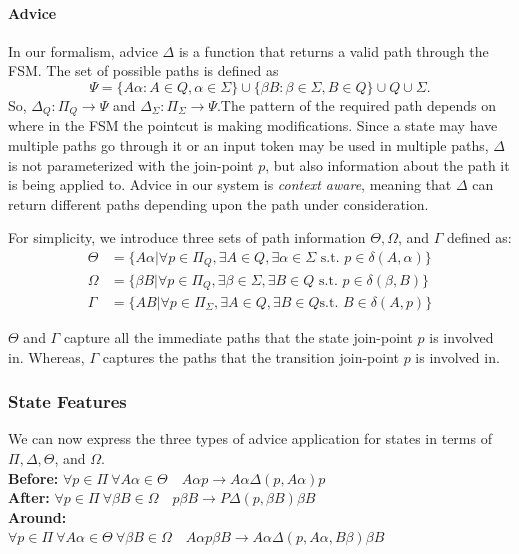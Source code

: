 \documentclass[sigplan,anonymous,review]{acmart}
\begin{document}
\paragraph{Advice} In our formalism, advice $\Delta$ is a function that returns a valid path through the FSM. The set of possible paths is defined as \[\Psi = \{A\alpha: A \in Q, \alpha \in \Sigma\} \cup \{\beta B: \beta \in \Sigma, B \in Q\} \cup Q \cup \Sigma.
\] So, $\Delta_Q: \Pi_Q \rightarrow \Psi$ and $\Delta_\Sigma: \Pi_\Sigma \rightarrow \Psi$.The pattern of the required path depends on where in the FSM the pointcut is making modifications. Since a state may have multiple paths go through it or an input token may be used in multiple paths, $\Delta$ is not parameterized with the join-point $p$, but also information about the path it is being applied to. Advice in our system is \emph{context aware}, meaning that $\Delta$ can return different paths depending upon the path under consideration. 

For simplicity, we introduce three sets of path information $\Theta, \Omega$, and $\Gamma$ defined as:
\begin{align*}
    \Theta &= \{A \alpha | \forall p \in \Pi_Q, \exists A \in Q, \exists \alpha \in \Sigma \text{ s.t. } p \in \delta(A, \alpha)\}\\
    \Omega &= \{\beta B | \forall p \in \Pi_Q, \exists \beta \in \Sigma, \exists B \in Q \text{ s.t. } p \in \delta(\beta, B)\}\\
    \Gamma &= \{AB | \forall p \in \Pi_\Sigma, \exists A \in Q, \exists B \in Q \text {s.t. } B \in \delta(A, p)\}
\end{align*}

$\Theta$ and $\Gamma$ capture all the immediate paths that the state join-point $p$ is involved in. Whereas, $\Gamma$ captures the paths that the transition join-point $p$ is involved in. 

\subsubsection{State Features}
We can now express the three types of advice application for states in terms of $\Pi, \Delta, \Theta$, and $\Omega$.\\
\textbf{Before:} $\forall p \in \Pi \ \forall A \alpha \in \Theta \quad A \alpha p \rightarrow A \alpha \Delta(p, A \alpha)p$\\
\textbf{After:} $\forall p \in \Pi \ \forall \beta B \in \Omega \quad p\beta B \rightarrow P\Delta(p, \beta B)\beta B$\\
\textbf{Around:} \\
$\forall p \in \Pi \ \forall A \alpha \in \Theta \ \forall \beta B \in \Omega \quad A \alpha p \beta B \rightarrow A \alpha \Delta(p, A \alpha, B \beta) \beta B $
\end{document}
